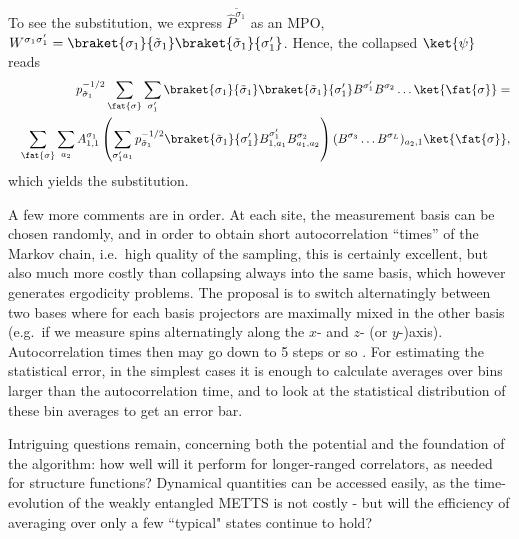 To see the substitution, we express $\hat{P}^{\tilde{\sigma}_1}$ as an MPO, $W^{\sigma_1 \sigma'_1} = \braket{\sigma_1}{\tilde{\sigma}_1} \braket{\tilde{\sigma}_1}{\sigma'_1}$. Hence, the collapsed $\ket{\psi}$ reads
\begin{eqnarray*}
& & p_{\tilde{\sigma}_1}^{-1/2} \sum_{\fat{\sigma}} \sum_{\sigma'_1} \braket{\sigma_1}{\tilde{\sigma}_1} \braket{\tilde{\sigma}_1}{\sigma'_1} B^{\sigma'_1} B^{\sigma_2} \ldots \ket{\fat{\sigma}} = \\
& & \sum_{\fat{\sigma}} \sum_{a_2} A^{\sigma_1}_{1,1} \left( \sum_{\sigma'_1 a_1}  p_{\tilde{\sigma}_1}^{-1/2}  \braket{\tilde{\sigma}_1}{\sigma'_1} B^{\sigma'_1}_{1,a_1} B^{\sigma_2}_{a_1,a_2} \right) (B^{\sigma_3} \ldots B^{\sigma_L})_{a_2,1} \ket{\fat{\sigma}} ,
\end{eqnarray*}
which yields the substitution.

A few more comments are in order. At each site, the measurement basis can be chosen randomly, and in order to obtain short autocorrelation ``times'' of the Markov chain, i.e.\ high quality of the sampling, this is certainly excellent, but also much more costly than collapsing always into the same basis, which however generates ergodicity problems. The proposal is to switch alternatingly between two bases where for each basis projectors are maximally mixed in the other basis (e.g.\ if we measure spins alternatingly along the $x$- and $z$- (or $y$-)axis). Autocorrelation times then may go down to 5 steps or so \cite{Stoudenmire10}. For estimating the statistical error, in the simplest cases it is enough to calculate averages over bins larger than the autocorrelation time, and to look at the statistical distribution of these bin averages to get an error bar. 

Intriguing questions remain, concerning both the potential and the foundation of the algorithm: how well will it perform for longer-ranged correlators, as needed for structure functions? Dynamical quantities can be accessed easily, as the time-evolution of the weakly entangled METTS is not costly - but will the efficiency of averaging over only a few ``typical" states continue to hold? 

